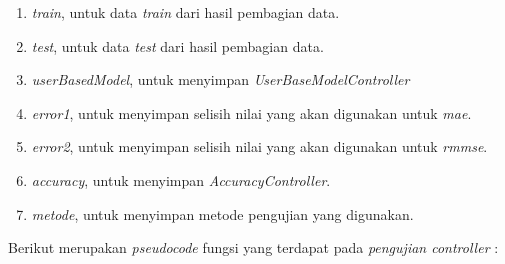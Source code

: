 \begin{enumerate}
    \item \textit{train}, untuk data \textit{train} dari hasil pembagian data.
    
    \item \textit{test}, untuk data \textit{test} dari hasil pembagian data.
    
    \item \textit{userBasedModel}, untuk menyimpan \textit{UserBaseModelController}
    
    \item \textit{error1}, untuk menyimpan selisih nilai yang akan digunakan untuk \textit{mae}.
    
    \item \textit{error2}, untuk menyimpan selisih nilai yang akan digunakan untuk \textit{rmmse}.
    
    \item \textit{accuracy}, untuk menyimpan \textit{AccuracyController}.
    
    \item \textit{metode}, untuk menyimpan metode pengujian yang digunakan.
\end{enumerate}

Berikut merupakan \textit{pseudocode} fungsi yang terdapat pada \textit{pengujian controller} :

